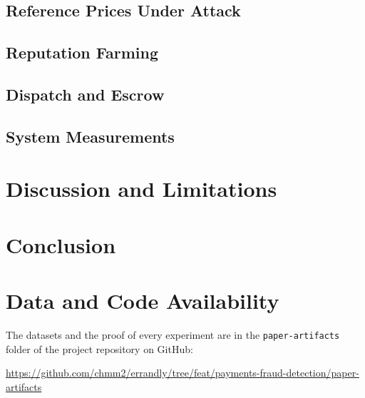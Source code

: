 \documentclass[journal]{IEEEtran}
\newcommand{\code}[1]{\texttt{#1}}
\begin{document}
\subsection{Reference Prices Under Attack}\label{sec:eval-price}


\subsection{Reputation Farming}\label{sec:eval-farming}


\subsection{Dispatch and Escrow}\label{sec:eval-dispatch}


\subsection{System Measurements}\label{sec:eval-system}


\section{Discussion and Limitations}\label{sec:discussion}


\section{Conclusion}\label{sec:conclusion}


\section*{Data and Code Availability}
The datasets and the proof of every experiment are in the \code{paper-artifacts}
folder of the project repository on GitHub:

\smallskip
{\raggedright\footnotesize
\url{https://github.com/chmm2/errandly/tree/feat/payments-fraud-detection/paper-artifacts}\par}
\smallskip
\end{document}
